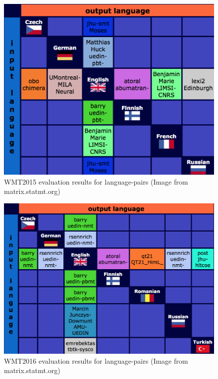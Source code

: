 \documentclass[landscape]{jhuslides3C}
\begin{document}
\begin{figure}
\begin{center}
\includegraphics[scale=0.5]{images/n2015.png}
\caption{WMT2015 evaluation results for language-pairs ({\tiny Image from matrix.statmt.org})}
\end{center}
\end{figure}

\begin{figure}
\begin{center}
\includegraphics[scale=0.5]{images/n2016.png}
\caption{WMT2016 evaluation results for language-pairs ({\tiny Image from matrix.statmt.org})}
\end{center}
\end{figure}
\end{document}

